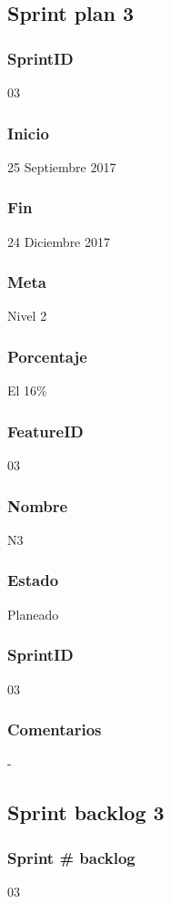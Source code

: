 

\subsection{Sprint plan 3}
\subsubsection{SprintID}
03
\subsubsection{Inicio}
25 Septiembre 2017
\subsubsection{Fin}
24 Diciembre 2017
\subsubsection{Meta}
Nivel 2
\subsubsection{Porcentaje}
El 16\% 

\subsubsection{FeatureID}
03
\subsubsection{Nombre}
N3
\subsubsection{Estado}
Planeado
\subsubsection{SprintID}
03
\subsubsection{Comentarios}
-


\subsection{Sprint backlog 3}
\subsubsection{Sprint # backlog}
03

